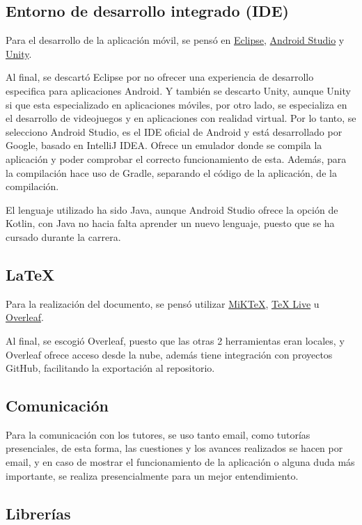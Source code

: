     \subsection{Entorno de desarrollo integrado (IDE)}
        Para el desarrollo de la aplicación móvil, se pensó en \href{https://www.eclipse.org/downloads/}{Eclipse}, \href{https://developer.android.com/studio}{Android Studio} y \href{https://unity.com/es}{Unity}.

        Al final, se descartó Eclipse por no ofrecer una experiencia de desarrollo especifica para aplicaciones Android. Y también se descarto Unity, aunque Unity si que esta especializado en aplicaciones móviles, por otro lado, se especializa en el desarrollo de videojuegos y en aplicaciones con realidad virtual.
        Por lo tanto, se selecciono Android Studio, es el IDE oficial de Android y está desarrollado por Google, basado en IntelliJ IDEA. Ofrece un emulador donde se compila la aplicación y poder comprobar el correcto funcionamiento de esta.
        Además, para la compilación hace uso de Gradle, separando el código de la aplicación, de la compilación.

        El lenguaje utilizado ha sido Java, aunque Android Studio ofrece la opción de Kotlin, con Java no hacia falta aprender un nuevo lenguaje, puesto que se ha cursado durante la carrera.

    \subsection{LaTeX}
        Para la realización del documento, se pensó utilizar \href{https://miktex.org/}{MiKTeX}, \href{https://www.tug.org/texlive/}{TeX Live} u \href{https://www.overleaf.com/}{Overleaf}.
    
        Al final, se escogió Overleaf, puesto que las otras 2 herramientas eran locales, y Overleaf ofrece acceso desde la nube, además tiene integración con proyectos GitHub, facilitando la exportación al repositorio.
    \subsection{Comunicación}
        Para la comunicación con los tutores, se uso tanto email, como tutorías presenciales, de esta forma, las cuestiones y los avances realizados se hacen por email, y en caso de mostrar el funcionamiento de la aplicación o alguna duda más importante, se realiza presencialmente para un mejor entendimiento.

    \subsection{Librerías}
    

